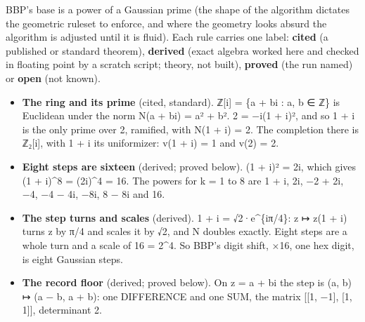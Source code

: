 BBP's base is a power of a Gaussian prime (the shape of the algorithm dictates the geometric ruleset to enforce, and where the geometry looks absurd the algorithm is adjusted until it is fluid). Each rule carries one label: \textbf{cited} (a published or standard theorem), \textbf{derived} (exact algebra worked here and checked in floating point by a scratch script; theory, not built), \textbf{proved} (the run named) or \textbf{open} (not known).

\begin{itemize}
\item \textbf{The ring and its prime} (cited, standard). ℤ[i] = \{a + bi : a, b ∈ ℤ\} is Euclidean under the norm N(a + bi) = a² + b². 2 = −i(1 + i)², and so 1 + i is the only prime over 2, ramified, with N(1 + i) = 2. The completion there is ℤ₂[i], with 1 + i its uniformizer: v(1 + i) = 1 and v(2) = 2.
\item \textbf{Eight steps are sixteen} (derived; proved below). (1 + i)² = 2i, which gives (1 + i)\textasciicircum{}8 = (2i)\textasciicircum{}4 = 16. The powers for k = 1 to 8 are 1 + i, 2i, −2 + 2i, −4, −4 − 4i, −8i, 8 − 8i and 16.
\item \textbf{The step turns and scales} (derived). 1 + i = √2·e\textasciicircum{}\{iπ/4\}: z ↦ z(1 + i) turns z by π/4 and scales it by √2, and N doubles exactly. Eight steps are a whole turn and a scale of 16 = 2\textasciicircum{}4. So BBP's digit shift, ×16, one hex digit, is eight Gaussian steps.
\item \textbf{The record floor} (derived; proved below). On z = a + bi the step is (a, b) ↦ (a − b, a + b): one DIFFERENCE and one SUM, the matrix [[1, −1], [1, 1]], determinant 2.


\end{itemize}
